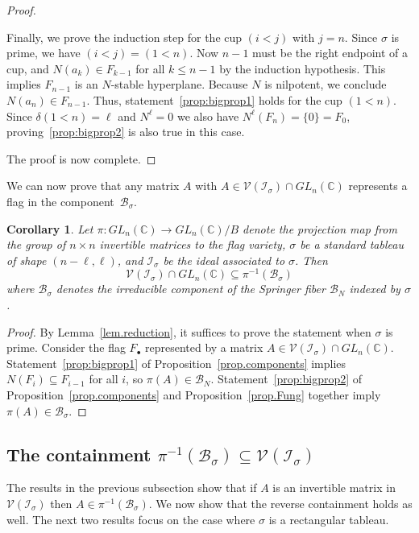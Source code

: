 \documentclass[11pt]{amsart}
\newtheorem{corollary}[theorem]{Corollary}
\theoremstyle{remark}
\theoremstyle{remark}
\theoremstyle{definition}
\theoremstyle{definition}
\theoremstyle{definition}
\numberwithin{equation}{section}
\newcommand{\C}{\mathbb{C}}           %
\newcommand{\gd}{\delta}
\newcommand{\gs}{\sigma}
\newcommand{\cb}{\mathcal{B}}
\newcommand{\ci}{\mathcal{I}}
\newcommand{\cv}{\mathcal{V}}
\newcommand{\SF}{\mathcal{B}}
\begin{document}
\begin{proof}
\

Finally, we prove the induction step for the cup $(i<j)$ with $j=n$. Since $\gs$ is prime, we have $(i<j) = (1<n)$. Now $n-1$ must be the right endpoint of a cup, and $N(a_k) \in F_{k-1}$ for all $k\leq n-1$ by the induction hypothesis. This implies $F_{n-1}$ is an $N$-stable hyperplane. Because $N$ is nilpotent, we conclude $N(a_n) \in F_{n-1}$. Thus, statement~\eqref{prop:bigprop1} holds for the cup $(1<n)$. Since $\gd(1<n) = \ell$ and $N^\ell =0$ we also have $N^\ell (F_n)=\{0\}=F_0$, proving~\eqref{prop:bigprop2} is also true in this case. 

The proof is now complete.
\end{proof}

We can now prove that any matrix $A$ with $A\in \cv(\ci_\gs)\cap GL_n(\C)$ represents a flag in the component~$\SF_\gs$. 

\begin{corollary}\label{cor.containment1}
Let $\pi: GL_n(\C) \to GL_n(\C)/B$ denote the projection map from the group of $n\times n$ invertible matrices to the flag variety, $\gs$ be a standard tableau of shape $(n-\ell,\ell)$, and $\ci_\gs$ be the ideal associated to $\gs$. Then 
\[
\cv(\ci_{\gs})\cap GL_n(\C) \subseteq \pi^{-1}(\SF_\gs)
\]
where $\cb_\gs$ denotes the irreducible component of the Springer fiber $\cb_N$ indexed by $\gs$.
\end{corollary}

\begin{proof} By Lemma~\ref{lem.reduction}, it suffices to prove the statement when $\gs$ is prime. Consider the flag $F_\bullet$ represented by a matrix $A\in \cv(\ci_\gs)\cap GL_n(\C)$. Statement~\eqref{prop:bigprop1} of Proposition~\ref{prop.components} implies $N(F_i)\subseteq F_{i-1}$ for all $i$, so $\pi(A) \in \SF_N$. Statement~\eqref{prop:bigprop2} of Proposition~\ref{prop.components} and Proposition~\ref{prop.Fung} together imply $\pi(A)\in \SF_\gs$. 
\end{proof}



\subsection{The containment $\pi^{-1}(\cb_\gs) \subseteq \cv(\ci_\gs)$}


The results in the previous subsection show that if $A$ is an invertible matrix in $ \cv(\ci_\gs)$  then $A\in \pi^{-1}(\cb_\gs)$. We now show that the reverse containment holds as well. The next two results focus on the case where $\gs$ is a rectangular tableau. 
\end{document}
